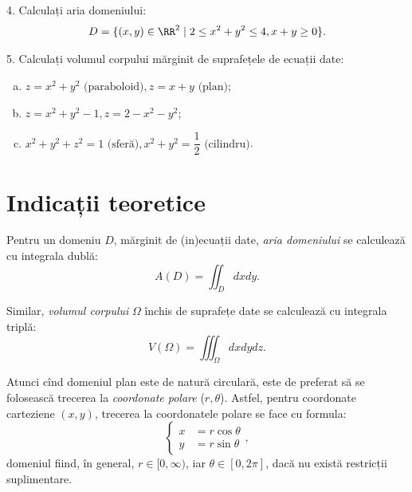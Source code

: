 \vspace{1cm}

4. Calculați aria domeniului:
\[
  D = \{(x, y) \in \RR^2 \mid 2 \leq x^2 + y^2 \leq 4, x + y \geq 0 \}.
\]

\vspace{1cm}

5. Calculați volumul corpului mărginit de suprafețele de ecuații date:
\begin{enumerate}[(a)]
\item $ z = x^2 + y^2 \text{ (paraboloid)}, z = x + y \text{ (plan)}$;
\item $ z = x^2 + y^2 - 1, z = 2 - x^2 - y^2 $;
\item $ x^2 + y^2 + z^2 = 1 \text{ (sferă)}, x^2 + y^2 = \dfrac{1}{2} %
  \text{ (cilindru)} $.
\end{enumerate}


\section{Indicații teoretice}

Pentru un domeniu $ D $, mărginit de (in)ecuații date, \emph{aria domeniului}
se calculează cu integrala dublă:
\[
  A(D) = \iint_D dxdy.
\]

Similar, \emph{volumul corpului} $ \Omega $ închis de suprafețe date se
calculează cu integrala triplă:
\[
  V(\Omega) = \iiint_\Omega dxdydz.
\]

Atunci cînd domeniul plan este de natură circulară, este de preferat să
se folosească trecerea la \emph{coordonate polare} ($r,\theta$). Astfel, pentru
coordonate carteziene $ (x, y) $, trecerea la coordonatele polare se face cu formula:
\[
  \begin{cases}
    x &= r \cos \theta \\
    y &= r \sin \theta
  \end{cases},
\]
domeniul fiind, în general, $ r \in [0, \infty) $, iar $ \theta \in [0, 2 \pi] $,
dacă nu există restricții suplimentare.

